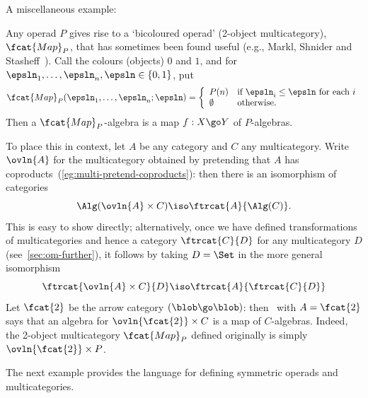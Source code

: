 A miscellaneous example:
%
\begin{example}%
%
%
Any operad $P$ gives rise to a `bicoloured operad' (2-object
multicategory), $\fcat{Map}_P$, that has sometimes been found useful (e.g.,
Markl, Shnider and Stasheff~\cite[\S 2.9]{MSS}).  Call the colours
(objects) $0$ and $1$, and for $\epsln_1, \ldots, \epsln_n, \epsln \in
\{0,1\}$, put
\[
\fcat{Map}_P (\epsln_1, \ldots, \epsln_n; \epsln)
=
\left\{
\begin{array}{ll}
P(n)		&\textrm{if } \epsln_i \leq \epsln \textrm{ for each }i	\\
\emptyset	&\textrm{otherwise}.
\end{array}
\right.
\]
Then a $\fcat{Map}_P$-algebra is a map $f: X \go Y$ of $P$-algebras. 

To place this in context, let $A$ be any category and $C$ any
multicategory.  Write $\ovln{A}$ for the multicategory obtained by
pretending that $A$ has coproducts~(\ref{eg:multi-pretend-coproducts}):
then there is an isomorphism of categories
%
\begin{equation}	\label{eq:exp-transpose-Alg}
\Alg(\ovln{A} \times C) \iso \ftrcat{A}{\Alg(C)}.
\end{equation}
%
This is easy to show directly; alternatively, once we have defined
transformations of multicategories and hence a category $\ftrcat{C}{D}$
for any multicategory $D$ (see~\ref{sec:om-further}), it follows
by taking $D=\Set$ in the more general isomorphism
\[
\ftrcat{\ovln{A} \times C}{D} \iso \ftrcat{A}{\ftrcat{C}{D}}
\]
Let $\fcat{2}$ be the arrow category $(\blob \go \blob)$:
then~ with $A = \fcat{2}$ says that an algebra
for $\ovln{\fcat{2}} \times C$ is a map of $C$-algebras.  Indeed, the
2-object multicategory $\fcat{Map}_P$ defined originally is simply
$\ovln{\fcat{2}} \times P$.
\end{example}

The next example provides the language for defining symmetric%
%
%
operads and multicategories.

